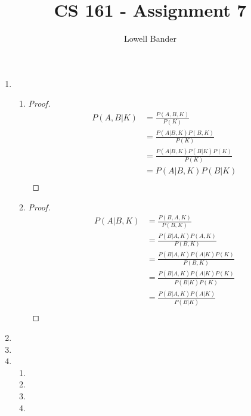 \documentclass[]{article}
\begin{document}
\title{CS 161 - Assignment 7}
\author{Lowell Bander}
\maketitle

\begin{enumerate}
\item \begin{enumerate}
\item \begin{proof}
\begin{align}
P(A,B|K) &= \frac{P(A,B,K)}{P(K)} \\
&= \frac{P(A|B,K)P(B,K)}{P(K)}\\
&= \frac{P(A|B,K)P(B|K)P(K)}{P(K)}\\
&= P(A|B,K)P(B|K)\\
\end{align} \end{proof}
\item \begin{proof}
\begin{align}
P(A|B,K) &= \frac{P(B,A,K)}{P(B,K)}\\
&= \frac{P(B|A,K)P(A,K)}{P(B,K)}\\
&= \frac{P(B|A,K)P(A|K)P(K)}{P(B,K)}\\
&= \frac{P(B|A,K)P(A|K)P(K)}{P(B|K)P(K)}\\
&= \frac{P(B|A,K)P(A|K)}{P(B|K)}\\
\end{align}
\end{proof}
\end{enumerate}
\item 
\item 
\item \begin{enumerate}
\item
\item
\item
\item
\end{enumerate}
\end{enumerate}
\end{document}
